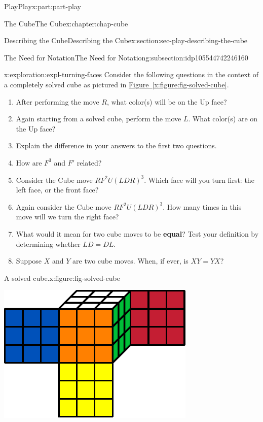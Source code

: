 \documentclass[oneside,10pt,]{book}
\newcommand{\xreffont}{\relax}
\newcommand{\terminology}[1]{\textbf{#1}}
\numberwithin{equation}{section}
\begin{document}
\begin{partptx}{Play}{}{Play}{}{}{x:part:part-play}
\begin{chapterptx}{The Cube}{}{The Cube}{}{}{x:chapter:chap-cube}
\begin{sectionptx}{Describing the Cube}{}{Describing the Cube}{}{}{x:section:sec-play-describing-the-cube}
\begin{subsectionptx}{The Need for Notation}{}{The Need for Notation}{}{}{g:subsection:idp105544742246160}
\begin{exploration}{}{x:exploration:expl-turning-faces}%
Consider the following questions in the context of a completely solved cube as pictured in \hyperref[x:figure:fig-solved-cube]{Figure~{\xreffont\ref{x:figure:fig-solved-cube}}}.%
%
\begin{enumerate}
\item{}After performing the move \(R\), what color(s) will be on the Up face?%
\item{}Again starting from a solved cube, perform the move \(L\). What color(s) are on the Up face?%
\item{}Explain the difference in your answers to the first two questions.%
\item{}How are \(F^3\) and \(F'\) related?%
\item{}Consider the Cube move \(RF^2 U (LDR)^3\). Which face will you turn first: the left face, or the front face?%
\item{}Again consider the Cube move \(RF^2 U (LDR)^3\). How many times in this move will we turn the right face?%
\item{}What would it mean for two cube moves to be \terminology{equal}? Test your definition by determining whether \(LD = DL\).%
\item{}Suppose \(X\) and \(Y\) are two cube moves. When, if ever, is \(XY = YX\)?%
\end{enumerate}
\begin{figureptx}{A solved cube.}{x:figure:fig-solved-cube}{}%
\begin{image}{0.25}{0.5}{0.25}%
\includegraphics[width=\linewidth]{./images/solved_cube_sf.pdf}
\end{image}%

\end{figureptx}
\end{exploration}
\end{subsectionptx}
\end{sectionptx}
\end{chapterptx}
\end{partptx}
\end{document}
